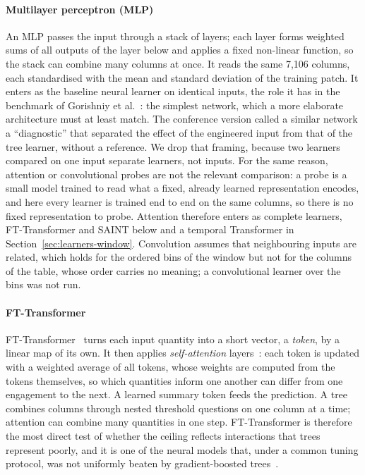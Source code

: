 \paragraph{Multilayer perceptron (MLP)}
An MLP passes the input through a stack of layers; each layer forms weighted sums of all outputs of the
layer below and applies a fixed non-linear function, so the stack can combine many columns at once. It
reads the same 7,106 columns, each standardised with the mean and standard deviation of the training
patch. It enters as the baseline neural learner on identical inputs, the role it has in the benchmark of
Gorishniy et al.~\cite{gorishniy2021revisiting}: the simplest network, which a more elaborate
architecture must at least match. The conference version called a similar network a ``diagnostic'' that
separated the effect of the engineered input from that of the tree learner, without a reference. We drop
that framing, because two learners compared on one input separate learners, not inputs. For the same
reason, attention or convolutional probes are not the relevant comparison: a probe is a small model
trained to read what a fixed, already learned representation encodes, and here every learner is trained
end to end on the same columns, so there is no fixed representation to probe. Attention therefore enters
as complete learners, FT-Transformer and SAINT below and a temporal Transformer in
Section~\ref{sec:learners-window}. Convolution assumes that neighbouring inputs are related, which holds
for the ordered bins of the window but not for the columns of the table, whose order carries no meaning;
a convolutional learner over the bins was not run.

\paragraph{FT-Transformer}
FT-Transformer~\cite{gorishniy2021revisiting} turns each input quantity into a short vector, a
\emph{token}, by a linear map of its own. It then applies \emph{self-attention}
layers~\cite{vaswani2017attention}: each token is updated with a weighted average of all tokens, whose
weights are computed from the tokens themselves, so which quantities inform one another can differ from
one engagement to the next. A learned summary token feeds the prediction. A tree combines columns through
nested threshold questions on one column at a time; attention can combine many quantities in one step.
FT-Transformer is therefore the most direct test of whether the ceiling reflects interactions that trees
represent poorly, and it is one of the neural models that, under a common tuning protocol, was not
uniformly beaten by gradient-boosted trees~\cite{gorishniy2021revisiting}.

